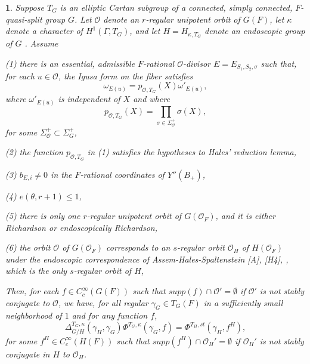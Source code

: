 \documentclass[12pt,letterpaper]{amsart}
\newcommand{\OF}{\mathcal{O}_F}
\newcommand{\proclaimname}{}
\newtheorem*{proclaimx}{\proclaimname}
\newenvironment{proclaim}[1]%
  {\renewcommand{\proclaimname}{#1}\begin{proclaimx}}{\end{proclaimx}}
\begin{document}
\iffalse
\begin{proclaim}{Conjecture 9.1} Suppose $T_G$ is an elliptic Cartan subgroup
of a connected, simply connected, $F$-quasi-split group $G$. Let
${\mathcal O}$ denote an $r$-regular unipotent orbit of $G(F)$,
let $\kappa$ denote a character of $H^1(\Gamma,T_G)$, and let
$H=H_{\kappa,T_G}$ denote an endoscopic group of $G$ \cite{La79}.
Assume

(1) there is an essential, admissible $F$-rational ${\mathcal O}$-divisor
$E=E_{S_1,S_2,\sigma}$ such that, for each $u\in {\mathcal O}$, the
Igusa form on the fiber satisfies
\[
\omega_{E(u)}=p_{{\mathcal O},T_G}(X)\omega'_{E(u)},
\]
where $\omega'_{E(u)}$ is independent of $X$ and where
\[
p_{{\mathcal O},T_G}(X)=\prod_{\sigma\in\Sigma_{\mathcal O}^+}\sigma(X),
\]
for some $\Sigma_{\mathcal O}^+\subset \Sigma_G^+$,

(2) the function $p_{{\mathcal O},T_G}$ in (1) satisfies the hypotheses to
Hales' reduction lemma,

(3) $b_{E,i}\not= 0$ in the $F$-rational coordinates of $Y''(B_+)$,

(4) $e(\theta,r+1)\leq 1$,

(5) there is only one $r$-regular unipotent orbit of $G(\OF)$, and
it is either Richardson or endoscopically Richardson,

(6) the orbit ${\mathcal O}$ of $G(\OF)$ corresponds to an $s$-regular orbit
${\mathcal O}_H$ of $H(\OF)$ under the endoscopic correspondence
of Assem-Hales-Spaltenstein [A], [H4], \cite{Spa82}, which
is the only $s$-regular orbit of $H$,

Then, for each $f\in C_c^\infty (G(F))$ such that
$supp(f)\cap {\mathcal O}'=\emptyset$ if ${\mathcal O}'$
is not stably conjugate to ${\mathcal O}$, we have,
for all regular $\gamma_G\in T_G(F)$
in a sufficiently small neighborhood of $1$ and for any
function $f$,
\[
\Delta_{G/H}^{T_G,\kappa}(\gamma_H,\gamma_G)
\Phi^{T_G,\kappa}(\gamma_G,f)=
\Phi^{T_H,st}(\gamma_H,f^H),
\]
for some $f^H\in C_c^\infty (H(F))$ such that
$supp(f^H)\cap {\mathcal O}_H'=\emptyset$ if ${\mathcal O}_H'$
is not stably conjugate in $H$ to ${\mathcal O}_H$.
\end{proclaim}
\end{document}
